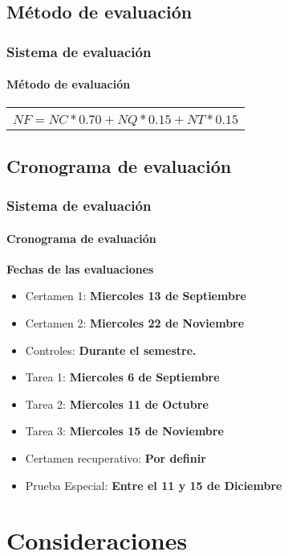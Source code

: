 \documentclass{beamer}
\begin{document}
\subsection{M\'etodo de evaluaci\'on}

\begin{frame}
			\frametitle{Sistema de evaluaci\'on}
			\framesubtitle{M\'etodo de evaluaci\'on}
	\begin{block}{}
		\begin{center}
					\begin{tabular}{c}
						\textbf{\color{red}{Notas de certamen}} \\
  							$NF = NC * 0.70 + NQ * 0.15 + NT * 0.15$\\
					\end{tabular}
		\end{center}	
	\end{block}
\end{frame}

		\subsection{Cronograma de evaluaci\'on}

		\begin{frame}
			\frametitle{Sistema de evaluaci\'on}
			\framesubtitle{Cronograma de evaluaci\'on}

			\textbf{Fechas de las evaluaciones}

			\begin{itemize}
				\item Certamen 1: \textbf{Miercoles 13 de Septiembre}
				\item Certamen 2: \textbf{Miercoles 22 de Noviembre}
				\item Controles: \textbf{Durante el semestre.}
				\item Tarea 1: \textbf{Miercoles 6 de Septiembre}
				\item Tarea 2: \textbf{Miercoles 11 de Octubre}
				\item Tarea 3: \textbf{Miercoles 15 de Noviembre}
				\item Certamen recuperativo: \textbf{Por definir}
				\item Prueba Especial: \textbf{Entre el 11 y 15 de Diciembre}
			\end{itemize}
		\end{frame}

	\section{Consideraciones}
\end{document}
